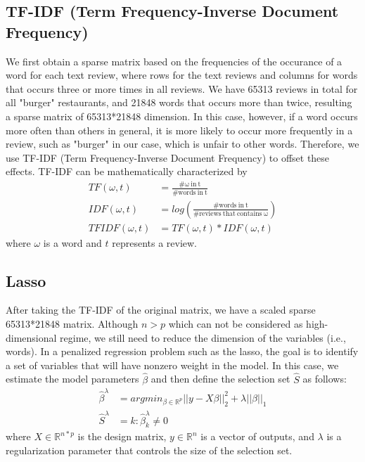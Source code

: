\documentclass[12pt]{article}
\begin{document}
\subsection{TF-IDF (Term Frequency-Inverse Document Frequency)}
We first obtain a sparse matrix based on the frequencies of the occurance of a word for each text review, where rows for the text reviews and columns for words that occurs three or more times in all reviews. We have 65313 reviews in total for all "burger" restaurants, and 21848 words that occurs more than twice, resulting a sparse matrix of 65313*21848 dimension. In this case, however, if a word occurs more often than others in general, it is more likely to occur more frequently in a review, such as "burger" in our case, which is unfair to other words. Therefore, we use TF-IDF (Term Frequency-Inverse Document Frequency) to offset these effects. TF-IDF can be mathematically characterized by 
\begin{equation}
\begin{aligned}
TF(\omega,t)&=\frac{\mathrm{\#\omega~in~t}}{\mathrm{\#words~in~t}}\\
IDF(\omega,t)&=log(\frac{\mathrm{\#words~in~t}}{\mathrm{\#reviews~that~contains~\omega}})\\
TFIDF(\omega,t) &= TF(\omega,t)*IDF(\omega,t)
\end{aligned}
\end{equation}
where $\omega$ is a word and $t$ represents a review. 

\subsection{Lasso}
\label{subsec:lasso}
After taking the TF-IDF of the original matrix, we have a scaled sparse 65313*21848 matrix. Although $n>p$ which can not be considered as high-dimensional regime, we still need to reduce the dimension of the variables (i.e., words). In a penalized regression problem such as the lasso, the goal is to identify a set of variables that will have nonzero weight in the model. In this case, we estimate the model parameters $\hat{\beta}$ and then define the selection set $\hat{S}$ as follows:
\begin{equation}
\begin{aligned}
\hat{\beta}^\lambda &= argmin_{\beta \in \mathbb{R}^p} ||y-X\beta||_2^2+\lambda||\beta||_1\\
\hat{S}^\lambda &= {k:\hat{\beta}_k^\lambda \neq 0}
\end{aligned}
\end{equation}
where $X \in\mathbb{R} ^{n*p} $ is the design matrix, $y \in \mathbb{R}^n$ is a vector of outputs, and $\lambda$ is a regularization parameter that controls the size of the selection set.
\end{document}
